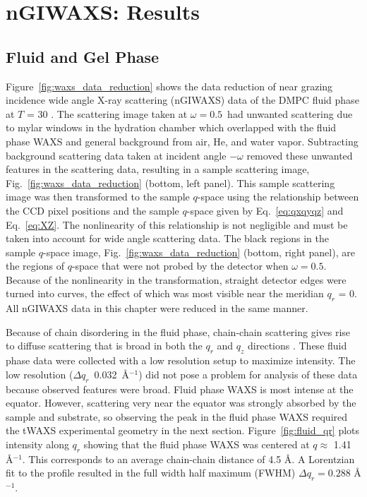 \section{nGIWAXS: Results}\label{sec:nGIWAXS_results}
\subsection{Fluid and Gel Phase}\label{sec:nGIWAXS_fluid_gel_phase}
Figure~\ref{fig:waxs_data_reduction} shows the data reduction of 
near grazing incidence wide angle X-ray scattering (nGIWAXS) data of
the DMPC fluid phase at $T$ = 30 \textcelsius.
The scattering image taken at $\omega=0.5$\textdegree\ had unwanted
scattering due to mylar windows in the hydration chamber which
overlapped with the fluid phase WAXS 
and general background from air, He, and water vapor.
Subtracting background scattering data taken at incident angle $-\omega$  
removed these unwanted features in the scattering data, 
resulting in a sample scattering 
image, Fig.~\ref{fig:waxs_data_reduction} 
(bottom, left panel).
This sample scattering image was then transformed to the
sample $q$-space using the relationship between the CCD 
pixel positions and the sample $q$-space
given by Eq.~\ref{eq:qxqyqz} and Eq.~\ref{eq:XZ}. The nonlinearity of this
relationship is
not negligible and must be taken into account for wide angle scattering data.
The black regions in the sample $q$-space 
image, 
Fig.~\ref{fig:waxs_data_reduction}
(bottom, right panel),
are the regions of $q$-space that were
not probed by the detector when $\omega=0.5$\textdegree. 
Because of the nonlinearity in the 
transformation, straight detector edges were turned into curves, the effect of
which was most visible near the meridian $q_r$ = 0. All nGIWAXS data
in this chapter were reduced in the same manner.

Because of chain disordering in the fluid phase, chain-chain scattering
gives rise to diffuse scattering that is broad in both the $q_r$ and $q_z$ directions \cite{ref:Mills08}. 
These fluid phase data were collected with a low resolution setup to maximize
intensity. The low resolution 
($\Delta q_r$~0.032~\AA$^{-1}$) 
did not pose a problem for analysis of these 
data because observed features were broad. Fluid 
phase WAXS
is most intense at the equator. However, scattering very near the equator
was strongly absorbed by the sample and substrate, so observing the 
peak in the fluid phase WAXS required the tWAXS experimental 
geometry in the next section.  
Figure~\ref{fig:fluid_qr} plots intensity along $q_r$ showing that
the fluid phase WAXS was centered at $q \approx$ 1.41 \AA$^{-1}$. 
This corresponds to an average chain-chain distance of 4.5 \AA. 
A Lorentzian fit to the profile resulted in the full width half maximum
(FWHM) $\Delta q_r=0.288$ \AA$^{-1}$.

